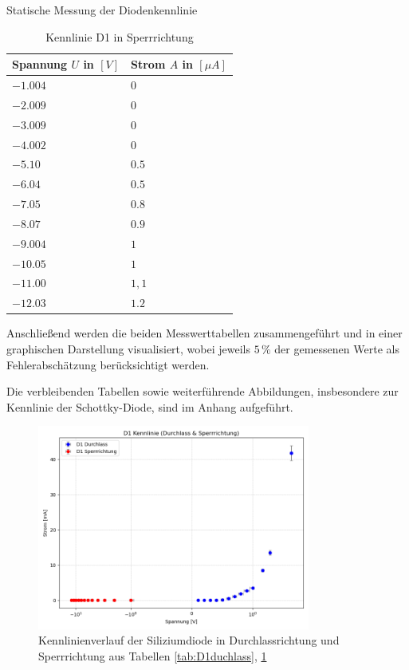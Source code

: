 \documentclass{article}
\theoremstyle{definition}
\begin{document}
\begin{aufgabe}{Statische Messung der Diodenkennlinie}
    \newpage

    \begin{table}[h!]
    \centering
    \begin{tabular}{|l|l|}
    \hline
    \textbf{Spannung $U$ in $[V]$} & \textbf{Strom $A$ in $[\mu A]$} \\
    \hline
    $-1.004$ & $0$ \\
    $-2.009$ & $0$\\
    $-3.009$ & $0$\\
    $-4.002$ & $0$\\
    $-5.10$ & $0.5$\\
    $-6.04$ & $0.5$\\
    $-7.05$ & $0.8$\\
    $-8.07$ & $0.9$\\
    $-9.004$ & $1$\\
    $-10.05$ & $1$\\
    $-11.00$ & $1,1$\\
    $-12.03$ & $1.2$\\
    \hline
    \end{tabular}
    \caption{Kennlinie D1 in Sperrrichtung}
    \label{tab:D1sperr}
    \end{table}

    Anschließend werden die beiden Messwerttabellen zusammengeführt und in einer graphischen Darstellung visualisiert, 
wobei jeweils $5\,\%$ der gemessenen Werte als Fehlerabschätzung berücksichtigt werden. 

Die verbleibenden Tabellen sowie weiterführende Abbildungen, insbesondere zur Kennlinie der Schottky-Diode, 
sind im Anhang aufgeführt.

     \begin{figure}[H]
        \centering
        \includegraphics[width=0.8\textwidth]{figs/dioden_d1_combined.png}
        \caption{Kennlinienverlauf der Siliziumdiode in Durchlassrichtung und Sperrrichtung aus Tabellen \ref{tab:D1duchlass}, \ref{tab:D1sperr} }
        \label{dioden_d1_combined}
    \end{figure}


\end{aufgabe}
\end{document}
